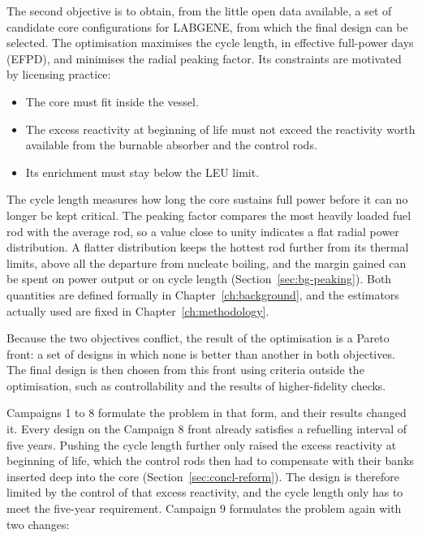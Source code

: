 The second objective is to obtain, from the little open data available,
a set of candidate core configurations for LABGENE, from which the
final design can be selected.
The optimisation maximises the cycle length, in effective full-power days 
(EFPD), and minimises the radial peaking factor. Its constraints are 
motivated by licensing practice:

\begin{itemize}
  \item The core must fit inside the vessel.

  \item The excess reactivity at beginning of life must not exceed the
        reactivity worth available from the burnable absorber and the
        control rods.

  \item Its enrichment must stay below the LEU limit.
\end{itemize}

The cycle length measures how long the core sustains full power before
it can no longer be kept critical. The peaking factor compares the most
heavily loaded fuel rod with the average rod, so a value close to unity
indicates a flat radial power distribution. A flatter distribution keeps
the hottest rod further from its thermal limits, above all the departure
from nucleate boiling, and the margin gained can be spent on power
output or on cycle length (Section~\ref{sec:bg-peaking}). Both
quantities are defined formally in Chapter~\ref{ch:background}, and
the estimators actually used are fixed in Chapter~\ref{ch:methodology}.

Because the two objectives conflict, the result of the optimisation is a
Pareto front: a set of designs in which none is better than another in
both objectives. The final design is then chosen from this front using
criteria outside the optimisation, such as controllability and the
results of higher-fidelity checks.

Campaigns 1 to 8 formulate the problem in that form, and their results
changed it. Every design on the Campaign 8 front already satisfies a
refuelling interval of five years. Pushing the cycle length further
only raised the excess reactivity at beginning of life, which the
control rods then had to compensate with their banks inserted deep into the
core (Section~\ref{sec:concl-reform}). The design is therefore limited
by the control of that excess reactivity, and the cycle length only has
to meet the five-year requirement. Campaign 9 formulates the problem again
with two changes:

